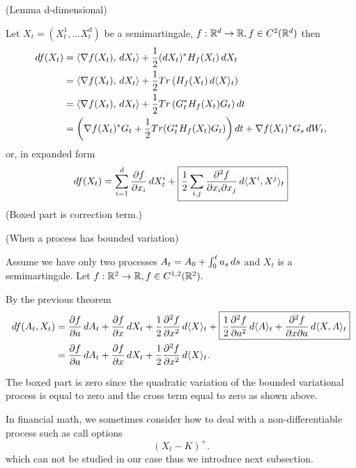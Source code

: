 \begin{thm}{(\ito Lemma d-dimensional)}

Let $X_t = (X_t^1, ... X_t^d)$ be a semimartingale, $f: \mathbb{R}^d \rightarrow \mathbb{R}, f\in C^2(\mathbb{R}^d)$ then
\begin{align*}
    \diff f(X_t) &= \inner{\nabla f(X_t)}{\diff X_t} + \frac{1}{2} (\diff X_t)^* H_f(X_t) \diff X_t \\
    &= \inner{\nabla f(X_t)}{\diff X_t} + \frac{1}{2} Tr\left(H_f(X_t)\diff \qvar{X}{t} \right) \\
    &= \inner{\nabla f(X_t)}{\diff X_t} + \frac{1}{2}Tr\left(G_t^* H_f(X_t)G_t \right) dt \\
    &= \left(\nabla f(X_t)^* G_t + \frac{1}{2}Tr(G_t^* H_f(X_t)G_t )\right)\diff t + \nabla f(X_t)^* G_s \diff W_t,
\end{align*}
or, in expanded form
\begin{equation*}
    \mathop{}\!d f(X_t) = \sum\limits_{i=1}^d  \frac{\partial f}{\partial x_i} \mathop{}\!d X_t^i + \boxed{\frac{1}{2} \sum\limits_{i,j} \frac{\partial^2 f}{\partial x_i\partial x_j} \mathop{}\!d \langle{X^i,X^j} \rangle_{t}}
\end{equation*}
(Boxed part is \ito correction term.)
\end{thm}

\begin{cor}{(When a process has bounded variation)}

Assume we have only two processes $A_t = A_0 + \int_0^t a_s \mathop{}\!d s$ and $X_t$ is a semimartingale. Let $f: \mathbb{R}^2 \rightarrow \mathbb{R}, f\in C^{1,2}(\mathbb{R}^2).$

\end{cor}
\pf By the previous theorem 
\begin{align*}
    df(A_t, X_t) &= \frac{\partial f}{\partial a} \diff A_t + \frac{\partial f}{\partial x} \diff X_t + \frac{1}{2} \frac{\partial^2 f}{\partial x^2} \diff \qvar{X}{t} + \boxed{\frac{1}{2} \frac{\partial^2 f}{\partial a^2} \diff \qvar{A}{t}+ \frac{\partial^2 f}{\partial x\partial a} \diff \qvar{X,A}{t}} \\
    &= \frac{\partial f}{\partial a} \diff A_t + \frac{\partial f}{\partial x} \diff X_t + \frac{1}{2} \frac{\partial^2 f}{\partial x^2} \diff \qvar{X}{t}.
\end{align*}

The boxed part is zero since the quadratic variation of the bounded variational process is equal to zero and the cross term equal to zero as shown above.

\begin{rem}
In financial math, we sometimes consider how to deal with a non-differentiable process such as call options
\begin{equation*}
    (X_t - K)^+.
\end{equation*} which can not be studied in our case thus we introduce next subsection.
\end{rem}


